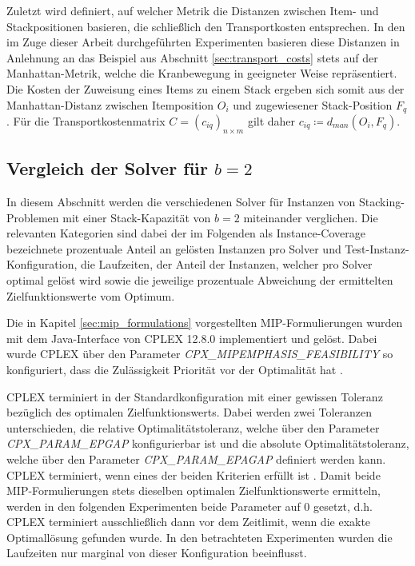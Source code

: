 Zuletzt wird definiert, auf welcher Metrik die Distanzen zwischen Item- und Stackpositionen
basieren, die schließlich den Transportkosten entsprechen.
In den im Zuge dieser Arbeit durchgeführten Experimenten basieren diese Distanzen in Anlehnung an das Beispiel
aus Abschnitt \ref{sec:transport_costs} stets auf der Manhattan-Metrik, welche die Kranbewegung in geeigneter Weise repräsentiert. Die Kosten der Zuweisung eines Items zu einem Stack ergeben sich somit aus der Manhattan-Distanz zwischen Itemposition $O_i$ und zugewiesener Stack-Position $F_q$. Für die Transportkostenmatrix $C = (c_{iq})_{n \times m}$ gilt
daher $c_{iq} \coloneqq d_{man}(O_i, F_q)$.

\vfill
\pagebreak

\subsection{Vergleich der Solver für $b = 2$}
\label{sec:solver_comp_b=2}

In diesem Abschnitt werden die verschiedenen Solver für Instanzen von Stacking-Problemen mit einer Stack-Kapazität von $b=2$ miteinander verglichen. Die relevanten Kategorien sind dabei der im Folgenden als Instance-Coverage bezeichnete prozentuale Anteil an gelösten Instanzen pro Solver und Test-Instanz-Konfiguration, die Laufzeiten, der Anteil der Instanzen, welcher pro Solver optimal gelöst wird
sowie die jeweilige prozentuale Abweichung der ermittelten Zielfunktionswerte vom Optimum.

Die in Kapitel \ref{sec:mip_formulations} vorgestellten MIP-Formulierungen wurden mit dem Java-Interface von \textsc{CPLEX} 12.8.0 implementiert
und gelöst. Dabei wurde \textsc{CPLEX} über den Parameter \textit{CPX\_MIPEMPHASIS\_FEASIBILITY} so konfiguriert, dass die Zulässigkeit
Priorität vor der Optimalität hat \cite{IBM_DOC}.

\textsc{CPLEX} terminiert in der Standardkonfiguration mit einer gewissen Toleranz bezüglich des optimalen Zielfunktionswerts.
Dabei werden zwei Toleranzen unterschieden, die relative Optimalitätstoleranz, welche über den Parameter
\textit{CPX\_PARAM\_EPGAP} konfigurierbar ist und die absolute Optimalitätstoleranz, welche über den Parameter
\textit{CPX\_PARAM\_EPAGAP} definiert werden kann. \textsc{CPLEX} terminiert, wenn eines der beiden Kriterien erfüllt ist \cite{CPLEX2015}.
Damit beide MIP-Formulierungen stets dieselben optimalen Zielfunktionswerte ermitteln, werden in den folgenden
Experimenten beide Parameter auf $0$ gesetzt, d.h. \textsc{CPLEX} terminiert ausschließlich dann vor dem Zeitlimit,
wenn die exakte Optimallösung gefunden wurde. In den betrachteten Experimenten wurden die Laufzeiten nur marginal
von dieser Konfiguration beeinflusst.

